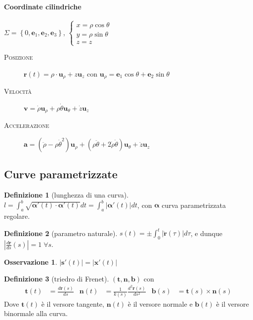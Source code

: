 \documentclass[a4paper,10pt]{article}
\theoremstyle{definition}
\newcommand{\bv}{\boldsymbol} %
\newcommand{\mylist}[1]{\textnormal{\textsc{#1}}}
\theoremstyle{indentdefinition}
\newtheorem{defn}{Definizione}[section]
\theoremstyle{indenttheorem}
\theoremstyle{myremark}
\newtheorem*{rem*}{Osservazione}
\theoremstyle{indentgeneral}
\begin{document}
\paragraph{Coordinate cilindriche}

$\Sigma=\left\{ 0,\boldsymbol{e}_{1},\boldsymbol{e}_{2},\boldsymbol{e}_{3}\right\} $,
$\begin{cases}
x=\rho\cos\theta\\
y=\rho\sin\theta\\
z=z
\end{cases}$
\begin{description}
\item [\mylist{Posizione}] $\boldsymbol{r}\left(t\right)=\rho\cdot\boldsymbol{u}_{\rho}+z\boldsymbol{u}_{z}$
con $\boldsymbol{u}_{\rho}=\boldsymbol{e}_{1}\cos\theta+\boldsymbol{e}_{2}\sin\theta$
\item [\mylist{Velocità}] $\boldsymbol{v}=\dot{\rho}\boldsymbol{u}_{\rho}+\rho\dot{\theta}\boldsymbol{u}_{\theta}+\dot{z}\boldsymbol{u}_{z}$
\item [\mylist{Accelerazione}] $\boldsymbol{a}=\left(\ddot{\rho}-\rho\dot{\theta}^{2}\right)\boldsymbol{u}_{\rho}+\left(\rho\ddot{\theta}+2\dot{\rho}\dot{\theta}\right)\boldsymbol{u}_{\theta}+\ddot{z}\boldsymbol{u}_{z}$
\end{description}

\subsection{Curve parametrizzate}
\begin{defn}[lunghezza di una curva]
\label{def:lunghezza-curva}$l=\int_{a}^{b}\sqrt{\bv{\alpha}'\left(t\right)\cdot\boldsymbol{\alpha}'\left(t\right)}dt=\int_{a}^{b}\left|\boldsymbol{\alpha}'\left(t\right)\right|dt$,
con $\boldsymbol{\alpha}$ curva parametrizzata regolare.
\end{defn}

\begin{defn}[parametro naturale]
\label{def:parametro-naturale}$s\left(t\right)=\pm\int_{0}^{t}\left|\dot{\boldsymbol{r}}\left(\tau\right)\right|d\tau$,
e dunque $\left|\frac{d\boldsymbol{r}}{ds}\left(s\right)\right|=1\;\forall s$.
\end{defn}
\begin{rem*}
    $|\bv{s}'(t)|=|\bv{x}'(t)|$
\end{rem*}
\begin{defn}[triedro di Frenet]
\label{def:triedro-Frenet}$\left(\boldsymbol{t},\boldsymbol{n},\boldsymbol{b}\right)$
con
\begin{align*}
\boldsymbol{t}\left(t\right) & =\frac{d\boldsymbol{r}\left(s\right)}{ds} & \boldsymbol{n}\left(t\right) & =\frac{1}{k\left(s\right)}\frac{d^{2}\boldsymbol{r}\left(s\right)}{ds^{2}} & \boldsymbol{b}\left(s\right) & =\boldsymbol{t}\left(s\right)\times\boldsymbol{n}\left(s\right)
\end{align*}
Dove $\bv{t}(t)$ è il versore tangente, $\bv{n}(t)$ è il versore normale e $\bv{b}(t)$ è il versore binormale alla curva.
\end{defn}
\end{document}
